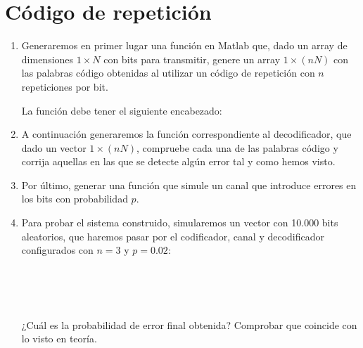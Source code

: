 \documentclass[es,practica]{uah}
\begin{document}
\profesor{}
\tel{}
\mail{}
\date{} 

\maketitle

\section{Código de repetición}

	\begin{enumerate}
	\item \textrm{Generaremos en primer lugar una función en Matlab que, dado un array de dimensiones $1 \times N$ con bits para transmitir, genere un array $1 \times (n N)$ con las palabras código obtenidas al utilizar un código de repetición con $n$ repeticiones por bit.}

		\textrm{La función debe tener el siguiente encabezado:}
		

	\item \textrm{A continuación generaremos la función correspondiente al decodificador, que dado un vector $1 \times (n N)$, compruebe cada una de las palabras código y corrija aquellas en las que se detecte algún error tal y como hemos visto.}
	

	\item \textrm{Por último, generar una función que simule un canal que introduce errores en los bits con probabilidad $p$.} 
	
			
	\item \textrm{Para probar el sistema construido, simularemos un vector con 10.000 bits aleatorios, que haremos pasar por el codificador, canal y decodificador configurados con $n=3$ y $p=0.02$:}
	
 		\\
		\\
		\\
	
		\textrm{¿Cuál es la probabilidad de error final obtenida? Comprobar que coincide con lo visto en teoría. }
	
\end{enumerate}
\end{document}
